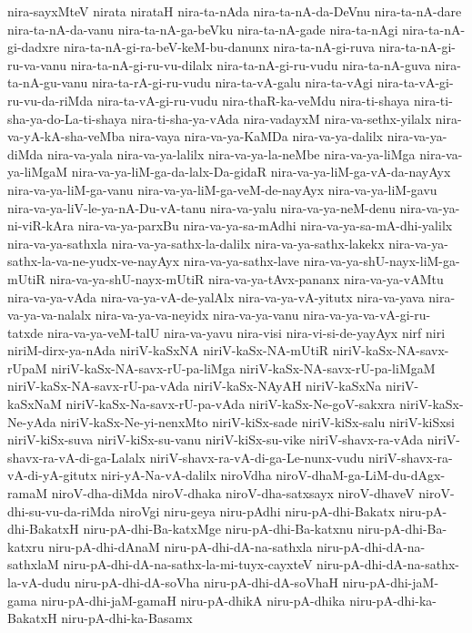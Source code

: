 {nira-sayxMteV
nirata
nirataH
nira-ta-nAda
nira-ta-nA-da-DeVnu
nira-ta-nA-dare
nira-ta-nA-da-vanu
nira-ta-nA-ga-beVku
nira-ta-nA-gade
nira-ta-nAgi
nira-ta-nA-gi-dadxre
nira-ta-nA-gi-ra-beV-keM-bu-danunx
nira-ta-nA-gi-ruva
nira-ta-nA-gi-ru-va-vanu
nira-ta-nA-gi-ru-vu-dilalx
nira-ta-nA-gi-ru-vudu
nira-ta-nA-guva
nira-ta-nA-gu-vanu
nira-ta-rA-gi-ru-vudu
nira-ta-vA-galu
nira-ta-vAgi
nira-ta-vA-gi-ru-vu-da-riMda
nira-ta-vA-gi-ru-vudu
nira-thaR-ka-veMdu
nira-ti-shaya
nira-ti-sha-ya-do-La-ti-shaya
nira-ti-sha-ya-vAda
nira-vadayxM
nira-va-sethx-yilalx
nira-va-yA-kA-sha-veMba
nira-vaya
nira-va-ya-KaMDa
nira-va-ya-dalilx
nira-va-ya-diMda
nira-va-yala
nira-va-ya-lalilx
nira-va-ya-la-neMbe
nira-va-ya-liMga
nira-va-ya-liMgaM
nira-va-ya-liM-ga-da-lalx-Da-gidaR
nira-va-ya-liM-ga-vA-da-nayAyx
nira-va-ya-liM-ga-vanu
nira-va-ya-liM-ga-veM-de-nayAyx
nira-va-ya-liM-gavu
nira-va-ya-liV-le-ya-nA-Du-vA-tanu
nira-va-yalu
nira-va-ya-neM-denu
nira-va-ya-ni-viR-kAra
nira-va-ya-parxBu
nira-va-ya-sa-mAdhi
nira-va-ya-sa-mA-dhi-yalilx
nira-va-ya-sathxla
nira-va-ya-sathx-la-dalilx
nira-va-ya-sathx-lakekx
nira-va-ya-sathx-la-va-ne-yudx-ve-nayAyx
nira-va-ya-sathx-lave
nira-va-ya-shU-nayx-liM-ga-mUtiR
nira-va-ya-shU-nayx-mUtiR
nira-va-ya-tAvx-pananx
nira-va-ya-vAMtu
nira-va-ya-vAda
nira-va-ya-vA-de-yalAlx
nira-va-ya-vA-yitutx
nira-va-yava
nira-va-ya-va-nalalx
nira-va-ya-va-neyidx
nira-va-ya-vanu
nira-va-ya-va-vA-gi-ru-tatxde
nira-va-ya-veM-talU
nira-va-yavu
nira-visi
nira-vi-si-de-yayAyx
nirf
niri
niriM-dirx-ya-nAda
niriV-kaSxNA
niriV-kaSx-NA-mUtiR
niriV-kaSx-NA-savx-rUpaM
niriV-kaSx-NA-savx-rU-pa-liMga
niriV-kaSx-NA-savx-rU-pa-liMgaM
niriV-kaSx-NA-savx-rU-pa-vAda
niriV-kaSx-NAyAH
niriV-kaSxNa
niriV-kaSxNaM
niriV-kaSx-Na-savx-rU-pa-vAda
niriV-kaSx-Ne-goV-sakxra
niriV-kaSx-Ne-yAda
niriV-kaSx-Ne-yi-nenxMto
niriV-kiSx-sade
niriV-kiSx-salu
niriV-kiSxsi
niriV-kiSx-suva
niriV-kiSx-su-vanu
niriV-kiSx-su-vike
niriV-shavx-ra-vAda
niriV-shavx-ra-vA-di-ga-Lalalx
niriV-shavx-ra-vA-di-ga-Le-nunx-vudu
niriV-shavx-ra-vA-di-yA-gitutx
niri-yA-Na-vA-dalilx
niroVdha
niroV-dhaM-ga-LiM-du-dAgx-ramaM
niroV-dha-diMda
niroV-dhaka
niroV-dha-satxsayx
niroV-dhaveV
niroV-dhi-su-vu-da-riMda
niroVgi
niru-geya
niru-pAdhi
niru-pA-dhi-Bakatx
niru-pA-dhi-BakatxH
niru-pA-dhi-Ba-katxMge
niru-pA-dhi-Ba-katxnu
niru-pA-dhi-Ba-katxru
niru-pA-dhi-dAnaM
niru-pA-dhi-dA-na-sathxla
niru-pA-dhi-dA-na-sathxlaM
niru-pA-dhi-dA-na-sathx-la-mi-tuyx-cayxteV
niru-pA-dhi-dA-na-sathx-la-vA-dudu
niru-pA-dhi-dA-soVha
niru-pA-dhi-dA-soVhaH
niru-pA-dhi-jaM-gama
niru-pA-dhi-jaM-gamaH
niru-pA-dhikA
niru-pA-dhika
niru-pA-dhi-ka-BakatxH
niru-pA-dhi-ka-Basamx
}
